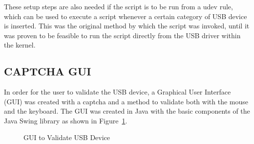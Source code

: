 \documentclass[pagenumbers]{ieee}
\begin{document}
These setup steps are also needed if the script is to be run from a udev rule, which can be used to execute a script whenever a certain category of USB device is inserted. This was the original method by which the script was invoked, until it was proven to be feasible to run the script directly from the USB driver within the kernel.


\subsection{CAPTCHA GUI}
\label{section:gui}

In order for the user to validate the USB device, a Graphical User Interface (GUI) was created with a captcha and a method to validate both with the mouse and the keyboard. The GUI was created in Java with the basic components of the Java Swing \cite{kim} library as shown in Figure~\ref{fig:JavaGUI}.

\begin{figure}[H]
	\caption{GUI to Validate USB Device}
	\label{fig:JavaGUI}
\end{figure}
\end{document}
